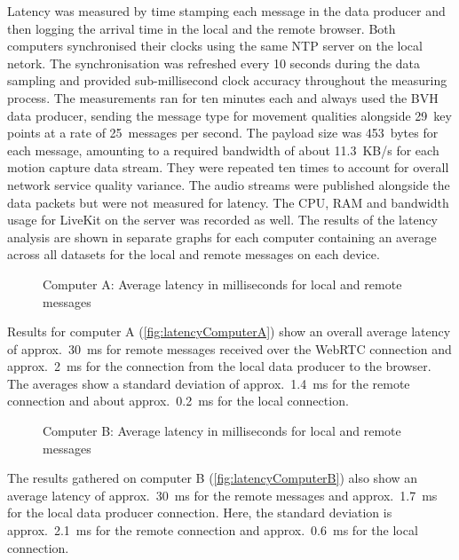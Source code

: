 Latency was measured by time stamping each message in the data producer and then logging the arrival time in the local and the remote browser.
Both computers synchronised their clocks using the same \ac{NTP} server on the local netork.
The synchronisation was refreshed every 10 seconds during the data sampling and provided sub-millisecond clock accuracy throughout the measuring process.
The measurements ran for ten minutes each and always used the \ac{BVH} data producer, sending the message type for movement qualities alongside 29~key points at a rate of 25~messages per second.
The payload size was 453~bytes for each message, amounting to a required bandwidth of about 11.3~\ac{KB/s} for each motion capture data stream.
They were repeated ten times to account for overall network service quality variance.
The audio streams were published alongside the data packets but were not measured for latency.
The \ac{CPU}, \ac{RAM} and bandwidth usage for LiveKit on the server was recorded as well.
The results of the latency analysis are shown in separate graphs for each computer containing an average across all datasets for the local and remote messages on each device.

\begin{figure}[!h]
\centering

\caption[Message latency on Computer A]{Computer A: Average latency in milliseconds for local and remote messages\protect}
\label{fig:latencyComputerA}
\end{figure}

Results for computer A (\autoref{fig:latencyComputerA}) show an overall average latency of approx.~30~\ac{ms} for remote messages received over the \ac{WebRTC} connection and approx.~2~\ac{ms} for the connection from the local data producer to the browser.
The averages show a standard deviation of approx.~1.4~\ac{ms} for the remote connection and about approx.~0.2~\ac{ms} for the local connection.

\begin{figure}[!h]
\centering

\caption[Message latency on Computer B]{Computer B: Average latency in milliseconds for local and remote messages\protect}
\label{fig:latencyComputerB}
\end{figure}

The results gathered on computer B (\autoref{fig:latencyComputerB}) also show an average latency of approx.~30~\ac{ms} for the remote messages and approx.~1.7~\ac{ms} for the local data producer connection.
Here, the standard deviation is approx.~2.1~\ac{ms} for the remote connection and approx.~0.6~\ac{ms} for the local connection.

